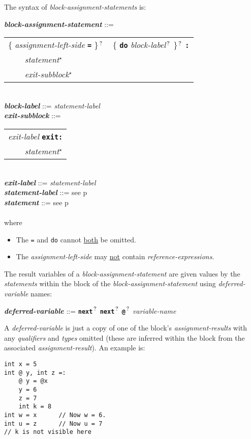 \documentclass[12pt]{article}
\newcommand{\TT}[1]{{\tt \bfseries #1}}
\newcommand{\STAR}{{\Large $^\star$}}
\newcommand{\QMARK}{{$^{\,\mbox{\footnotesize ?}}$}}
\newcommand{\ttkey}[1]{{\tt \bfseries #1}}
\newcommand{\emkey}[1]{{\em \bfseries #1}}
\newcommand{\pagref}[1]{p\pageref{#1}}
\newenvironment{indpar}[1][0.3in]%
	{\begin{list}{}%
		     {\setlength{\itemsep}{0in}%
		      \setlength{\topsep}{0in}%
		      \setlength{\parsep}{1ex}%
		      \setlength{\labelwidth}{#1}%
		      \setlength{\leftmargin}{#1}%
		      \addtolength{\leftmargin}{\labelsep}}%
	 \item}%
	{\end{list}}
\begin{document}
The syntax of {\em block-assignment-statements} is:

\begin{indpar}
\emkey{block-assignment-statement} ::= \\
\hspace*{0.5in}\begin{tabular}[t]{l}
        \{ {\em assignment-left-side} \TT{=} \}\QMARK{}
	~ \{ \ttkey{do} {\em block-label}\QMARK{} \}\QMARK{}
	\TT{:} \\
	\TT{~~~~}{\em statement}\STAR{} \\
	\TT{~~~~}{\em exit-subblock}\STAR{}
	\end{tabular} \\
\emkey{block-label} ::= {\em statement-label}
\\[0.5ex]
\emkey{exit-subblock} ::=
    \begin{tabular}[t]{l}
    {\em exit-label} \ttkey{exit}\TT{:} \\
    \TT{~~~~}{\em statement}\STAR{} \\
    \end{tabular} \\
\emkey{exit-label} ::= {\em statement-label}
\\[0.5ex]
\emkey{statement-label} ::= see \pagref{STATEMENT-LABEL} \\
\emkey{statement} ::= see \pagref{STATEMENT} \\
\\[1ex]
where
\begin{itemize}
\item The {\tt =} and {\tt do} cannot \underline{both} be omitted.
\item The {\em assignment-left-side} may \underline{not} contain
{\em reference-expressions}.
\end{itemize}
\end{indpar}

The result variables of a {\em block-assignment-statement}
are given values by the {\em statements} within the block
of the {\em block-assignment-statement} using {\em deferred-variable}
names:
\begin{indpar}
\emkey{deferred-variable}\label{DEFERRED-VARIABLE} ::=
    \TT{next}\QMARK{} \TT{next}\QMARK{} \TT{@}\QMARK{} {\em variable-name}
\end{indpar}
A {\em deferred-variable} is just a copy of one of the
block's {\em assignment-results} with any {\em qualifiers}
and {\em types} omitted (these are inferred within the block
from the associated {\em assignment-result}).  An example is:
\begin{indpar}\begin{verbatim}
int x = 5
int @ y, int z =:
    @ y = @x
    y = 6
    z = 7
    int k = 8
int w = x      // Now w = 6.
int u = z      // Now u = 7
// k is not visible here
\end{verbatim}\end{indpar}
\end{document}
